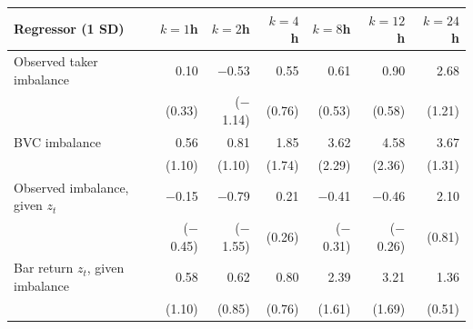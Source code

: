 \begin{tabular}{lrrrrrr}
\toprule
Regressor (1 SD) & $k=1$h & $k=2$h & $k=4$h & $k=8$h & $k=12$h & $k=24$h\\
\midrule
Observed taker imbalance & 0.10 & \ensuremath{-}0.53 & 0.55 & 0.61 & 0.90 & 2.68\\
 & (0.33) & (\ensuremath{-}1.14) & (0.76) & (0.53) & (0.58) & (1.21)\\
BVC imbalance & 0.56 & 0.81 & 1.85 & 3.62 & 4.58 & 3.67\\
 & (1.10) & (1.10) & (1.74) & (2.29) & (2.36) & (1.31)\\
Observed imbalance, given $z_t$ & \ensuremath{-}0.15 & \ensuremath{-}0.79 & 0.21 & \ensuremath{-}0.41 & \ensuremath{-}0.46 & 2.10\\
 & (\ensuremath{-}0.45) & (\ensuremath{-}1.55) & (0.26) & (\ensuremath{-}0.31) & (\ensuremath{-}0.26) & (0.81)\\
Bar return $z_t$, given imbalance & 0.58 & 0.62 & 0.80 & 2.39 & 3.21 & 1.36\\
 & (1.10) & (0.85) & (0.76) & (1.61) & (1.69) & (0.51)\\
\bottomrule
\end{tabular}
